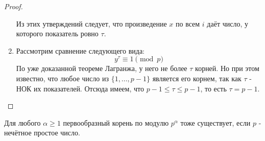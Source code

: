 \begin{proof}
\begin{enumerate}
		Из этих утверждений следует, что произведение $x$ по всем $i$ даёт число, у которого показатель ровно $\tau$.
		
		\item Рассмотрим сравнение следующего вида:
		\[
			y^{\tau} \equiv 1 \pmod p
		\]
		По уже доказанной теореме Лагранжа, у него не более $\tau$ корней. Но при этом известно, что любое число из $\{1, \ldots, p - 1\}$ является его корнем, так как $\tau$ - НОК их показателей. Отсюда имеем, что $p - 1 \le \tau \le p - 1$, то есть $\tau = p - 1$.
	\end{enumerate}
\end{proof}

\begin{theorem}
	Для любого $\alpha \ge 1$ первообразный корень по модулю $p^\alpha$ тоже существует, если $p$ - нечётное простое число.
\end{theorem}

